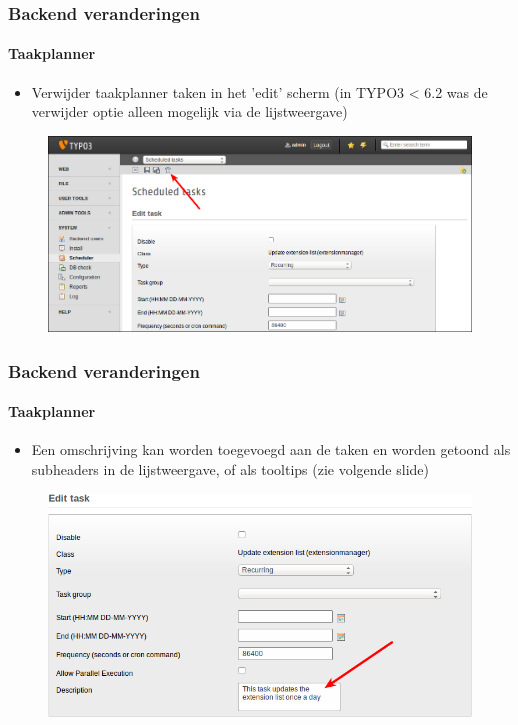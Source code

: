 
\begin{frame}[fragile]
	\frametitle{Backend veranderingen}
	\framesubtitle{Taakplanner}

	\begin{itemize}
		\item Verwijder taakplanner taken in het 'edit' scherm \newline
			(in TYPO3 < 6.2 was de verwijder optie alleen mogelijk via de lijstweergave)
	\end{itemize}

	\begin{figure}
		\includegraphics[width=0.95\linewidth]{Images/BackendChanges/DeleteSchedulerTaskInEditView.png}
	\end{figure}

\end{frame}


\begin{frame}[fragile]
	\frametitle{Backend veranderingen}
	\framesubtitle{Taakplanner}

	\begin{itemize}
		\item Een omschrijving kan worden toegevoegd aan de taken en worden getoond als subheaders in de lijstweergave, of als tooltips (zie volgende slide)
	\end{itemize}

	\begin{figure}
		\includegraphics[width=0.7\linewidth]{Images/BackendChanges/SchedulerTaskDescription.png}
	\end{figure}

\end{frame}

